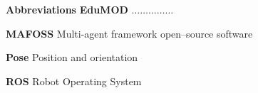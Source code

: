 
\renewcommand{\nomname}{Nomenclature}
\renewcommand{\nomAname}{\textbf{\large Abbreviations}}
\renewcommand{\nomGname}{\textbf{\large Mathematical Symbols}}
\renewcommand{\nomXname}{\textbf{\large Superscripts}}
\renewcommand{\nomZname}{\textbf{\large Subscripts}}

\printnomenclature
\cleardoublepage
{} %


\nomAname
\bigbreak
\textbf{EduMOD}  $\ldots\ldots\ldots\ldots\ldots$

\textbf{MAFOSS}  Multi-agent framework open--source software 

\textbf{Pose}  Position and orientation

\textbf{ROS}  Robot Operating System


